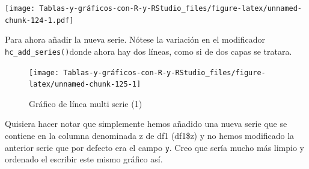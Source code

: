 \documentclass[
]{book}
\newenvironment{Shaded}{\begin{snugshade}}{\end{snugshade}}
\newcommand{\AttributeTok}[1]{\textcolor[rgb]{0.77,0.63,0.00}{#1}}
\newcommand{\ConstantTok}[1]{\textcolor[rgb]{0.00,0.00,0.00}{#1}}
\newcommand{\FunctionTok}[1]{\textcolor[rgb]{0.00,0.00,0.00}{#1}}
\newcommand{\NormalTok}[1]{#1}
\newcommand{\SpecialCharTok}[1]{\textcolor[rgb]{0.00,0.00,0.00}{#1}}
\newcommand{\StringTok}[1]{\textcolor[rgb]{0.31,0.60,0.02}{#1}}
\begin{document}
\texttt{[image: Tablas-y-gráficos-con-R-y-RStudio\_files/figure-latex/unnamed-chunk-124-1.pdf]}

Para ahora añadir la nueva serie. Nótese la variación en el modificador \texttt{hc\_add\_series()}donde ahora hay dos líneas, como si de dos capas se tratara.

\begin{Shaded}
\end{Shaded}

\begin{figure}[H]

{\centering \texttt{[image: Tablas-y-gráficos-con-R-y-RStudio\_files/figure-latex/unnamed-chunk-125-1]} 

}

\caption{Gráfico de línea multi serie (1)}\label{fig:unnamed-chunk-125}
\end{figure}

Quisiera hacer notar que simplemente hemos añadido una nueva serie que se contiene en la columna denominada z de df1 (df1\$z) y no hemos modificado la anterior serie que por defecto era el campo \texttt{y}. Creo que sería mucho más limpio y ordenado el escribir este mismo gráfico así.
\end{document}
